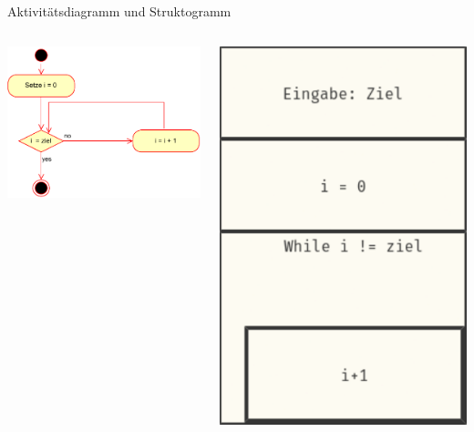 \documentclass[xelatex,aspectratio=169]{beamer}
\begin{document}
\begin{frame}{Aktivitätsdiagramm und Struktogramm}
  \begin{columns}
    \begin{column}{.6\linewidth}
      \includegraphics[width=\textwidth]{fig/algorithmus_aktivitaetsdiagram.drawio.pdf}
    \end{column}
    \begin{column}{.3\linewidth}
      \includegraphics[width=\textwidth]{fig/algorithmus_struktogram.pdf}


\end{column}
\end{columns}
\end{frame}
\end{document}
